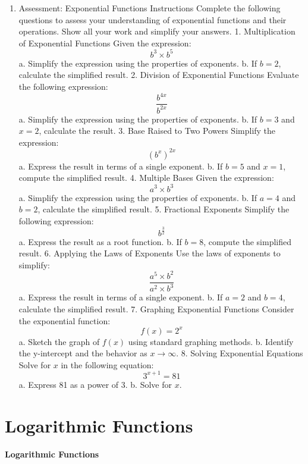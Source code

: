 \begin{enumerate}
    \item Assessment: Exponential Functions Instructions Complete the following questions to assess your understanding of exponential functions and their operations. Show all your work and simplify your answers. 1. Multiplication of Exponential Functions Given the expression: $$ b^3 \times b^5 $$ a. Simplify the expression using the properties of exponents. b. If $b = 2$, calculate the simplified result. 2. Division of Exponential Functions Evaluate the following expression: $$ \frac{b^{4x}}{b^{2x}} $$ a. Simplify the expression using the properties of exponents. b. If $b = 3$ and $x = 2$, calculate the result. 3. Base Raised to Two Powers Simplify the expression: $$ \left(b^x\right)^{2x} $$ a. Express the result in terms of a single exponent. b. If $b = 5$ and $x = 1$, compute the simplified result. 4. Multiple Bases Given the expression: $$ a^3 \times b^3 $$ a. Simplify the expression using the properties of exponents. b. If $a = 4$ and $b = 2$, calculate the simplified result. 5. Fractional Exponents Simplify the following expression: $$ b^{\frac{3}{2}} $$ a. Express the result as a root function. b. If $b = 8$, compute the simplified result. 6. Applying the Laws of Exponents Use the laws of exponents to simplify: $$ \frac{a^5 \times b^2}{a^2 \times b^3} $$ a. Express the result in terms of a single exponent. b. If $a = 2$ and $b = 4$, calculate the simplified result. 7. Graphing Exponential Functions Consider the exponential function: $$ f(x) = 2^x $$ a. Sketch the graph of $f(x)$ using standard graphing methods. b. Identify the y-intercept and the behavior as $x \to \infty$. 8. Solving Exponential Equations Solve for $x$ in the following equation: $$ 3^{x+1} = 81 $$ a. Express 81 as a power of 3. b. Solve for $x$.
\end{enumerate}

\section{Logarithmic Functions}
\label{sec:logarithmic-functions}

\paragraph{Logarithmic Functions}


